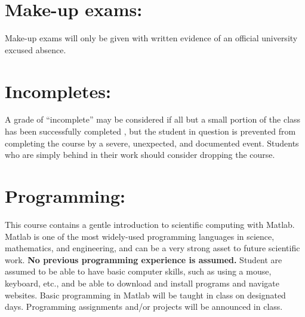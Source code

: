 \documentclass[margin]{res}
\theoremstyle{plain}
\theoremstyle{definition}
\theoremstyle{remark}
\begin{document}
\begin{resume}
\section{Make-up exams:}
Make-up exams will only be given with written evidence of an official university
excused absence. 

\section{Incompletes:}
A grade of ``incomplete'' may be considered if all but a small portion of the class has been successfully completed , but the student in question is prevented from completing the course by a severe, unexpected, and documented event. Students who are simply behind in their work should consider dropping the course.

\section{Programming:}   This course contains a gentle introduction to scientific computing with Matlab.  Matlab is one of the most widely-used programming languages in science, mathematics, and engineering, and can be a very strong asset to future scientific work.  \textbf{No previous programming experience is assumed.}  Student are assumed to be able to have basic computer skills, such as using a mouse, keyboard, etc., and be able to download and install programs and navigate websites.  Basic programming in Matlab will be taught in class on designated days.  Programming assignments and/or projects will be announced in class.




\end{resume}
\end{document}
